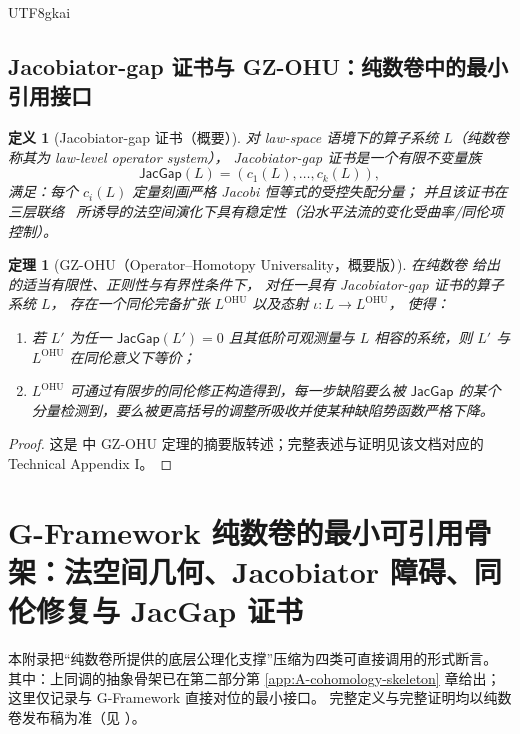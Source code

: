 \documentclass[12pt]{article}
\newtheorem{definition}{定义}[section]
\newtheorem{theorem}{定理}[section]
\begin{document}
\begin{CJK*}{UTF8}{gkai}
\subsection{Jacobiator-gap 证书与 GZ-OHU：纯数卷中的最小引用接口}

\begin{definition}[Jacobiator-gap 证书（概要）]\label{def:A-jacgap}
对 law-space 语境下的算子系统 $L$（纯数卷 \cite{GaoZheng2025GFramework} 称其为 law-level operator system），
Jacobiator-gap 证书是一个有限不变量族
\[
  \mathsf{JacGap}(L)=(c_1(L),\dots,c_k(L)),
\]
满足：每个 $c_i(L)$ 定量刻画严格 Jacobi 恒等式的受控失配分量；
并且该证书在三层联络 \GZTLC\ 所诱导的法空间演化下具有稳定性（沿水平法流的变化受曲率/同伦项控制）。
\end{definition}

\begin{theorem}[GZ-OHU（Operator--Homotopy Universality，概要版）]\label{thm:A-gz-ohu}
在纯数卷 \cite{GaoZheng2025GFramework} 给出的适当有限性、正则性与有界性条件下，
对任一具有 Jacobiator-gap 证书的算子系统 $L$，
存在一个同伦完备扩张 $L^{\mathrm{OHU}}$ 以及态射 $\iota:L\to L^{\mathrm{OHU}}$，
使得：
\begin{enumerate}
  \item 若 $L'$ 为任一 $\mathsf{JacGap}(L')=0$ 且其低阶可观测量与 $L$ 相容的系统，则 $L'$ 与 $L^{\mathrm{OHU}}$ 在同伦意义下等价；
  \item $L^{\mathrm{OHU}}$ 可通过有限步的同伦修正构造得到，每一步缺陷要么被 $\mathsf{JacGap}$ 的某个分量检测到，要么被更高括号的调整所吸收并使某种缺陷势函数严格下降。
\end{enumerate}
\end{theorem}
\begin{proof}
这是 \cite{GaoZheng2025GFramework} 中 GZ-OHU 定理的摘要版转述；完整表述与证明见该文档对应的 Technical Appendix I。
\end{proof}

\clearpage

\section{G-Framework 纯数卷的最小可引用骨架：法空间几何、Jacobiator 障碍、同伦修复与 JacGap 证书}\label{app:B-gframework-puremath-backbone}

本附录把“纯数卷所提供的底层公理化支撑”压缩为四类可直接调用的形式断言。
其中：上同调的抽象骨架已在第二部分第 \ref{app:A-cohomology-skeleton} 章给出；
这里仅记录与 G-Framework 直接对位的最小接口。
完整定义与完整证明均以纯数卷发布稿为准（见 \cite{GaoZheng2025GFramework}）。


\end{CJK*}
\end{document}
